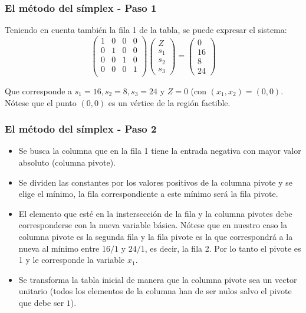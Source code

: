 \documentclass{beamer}
\begin{document}
\begin{frame}
\frametitle{El m\'etodo del s\'implex - Paso 1}
Teniendo en cuenta tambi\'en la fila 1 de la tabla, se puede expresar el sistema:
\[\left(\begin{array}{cccc}
1&0&0&0 \\
0&1&0&0 \\
0&0&1&0 \\
0&0&0&1 \\
 \end{array}\right)
 \left(\begin{array}{c}
Z\\s_1\\s_2\\s_3
 \end{array}\right) = 
  \left(\begin{array}{c}
0\\16\\8\\24
 \end{array}\right) 
 \]

Que corresponde a $s_1=16, s_2 = 8, s_3 = 24$ y $Z=0$ (con $(x_1,x_2) = (0,0)$. N\'otese que el punto $(0,0)$ es un v\'ertice de la regi\'on factible.
\end{frame}



\begin{frame}
\frametitle{El m\'etodo del s\'implex - Paso 2}
\begin{itemize}
\item Se busca la columna que en la fila 1 tiene la entrada negativa con mayor valor absoluto (columna pivote).
\item Se dividen las constantes por los valores positivos de la columna pivote y se elige el m\'inimo, la fila correspondiente a este m\'inimo ser\'a la fila pivote.
\item El elemento que est\'e en la instersecci\'on de la fila y la columna pivotes debe corresponderse con la nueva variable b\'asica. N\'otese que en nuestro caso la columna pivote es la segunda fila y la fila pivote es la que correspondr\'a a la nueva al m\'inimo entre $16/1$ y $24/1$, es decir, la fila 2. Por lo tanto el pivote es 1 y le corresponde la variable $x_1$.
\item Se transforma la tabla inicial de manera que la columna pivote sea un vector unitario (todos los elementos de la columna han de ser nulos salvo el pivote que debe ser $1$). 
\end{itemize}
\end{frame}
\end{document}
